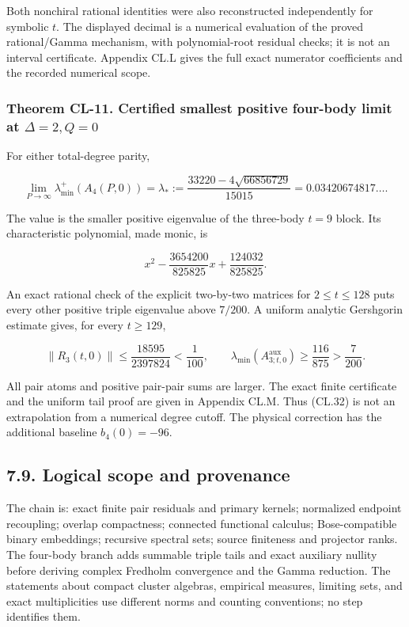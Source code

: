 \documentclass[a4paper,11pt]{article}
\numberwithin{equation}{section}
\begin{document}
Both nonchiral rational identities were also reconstructed independently for symbolic \(t\). The displayed decimal is a numerical evaluation of the proved rational/Gamma mechanism, with polynomial-root residual checks; it is not an interval certificate. Appendix CL.L gives the full exact numerator coefficients and the recorded numerical scope.

\hypertarget{theorem-cl-11.-certified-smallest-positive-four-body-limit-at-delta2q0}{%
\subsubsection{\texorpdfstring{Theorem CL-11. Certified smallest positive four-body limit at \(\Delta=2,Q=0\)}{Theorem CL-11. Certified smallest positive four-body limit at \textbackslash Delta=2,Q=0}}\label{theorem-cl-11.-certified-smallest-positive-four-body-limit-at-delta2q0}}

For either total-degree parity,

\[
\lim_{P\to\infty}\lambda_{\min}^+(A_4(P,0))
=\lambda_*:=\frac{33220-4\sqrt{66856729}}{15015}
=0.03420674817\ldots.
\tag{CL.32}
\]

The value is the smaller positive eigenvalue of the three-body \(t=9\) block. Its characteristic polynomial, made monic, is

\[
x^2-\frac{3654200}{825825}x+\frac{124032}{825825}.
\]

An exact rational check of the explicit two-by-two matrices for \(2\leq t\leq128\) puts every other positive triple eigenvalue above \(7/200\). A uniform analytic Gershgorin estimate gives, for every \(t\geq129\),

\[
\|R_3(t,0)\|\leq\frac{18595}{2397824}<\frac1{100},
\qquad
\lambda_{\min}(A_{3;t,0}^{\mathrm{aux}})\geq\frac{116}{875}>
\frac7{200}.
\tag{CL.33}
\]

All pair atoms and positive pair-pair sums are larger. The exact finite certificate and the uniform tail proof are given in Appendix CL.M. Thus (CL.32) is not an extrapolation from a numerical degree cutoff. The physical correction has the additional baseline \(b_4(0)=-96\).

\hypertarget{logical-scope-and-provenance}{%
\subsection{7.9. Logical scope and provenance}\label{logical-scope-and-provenance}}

The chain is: exact finite pair residuals and primary kernels; normalized endpoint recoupling; overlap compactness; connected functional calculus; Bose-compatible binary embeddings; recursive spectral sets; source finiteness and projector ranks. The four-body branch adds summable triple tails and exact auxiliary nullity before deriving complex Fredholm convergence and the Gamma reduction. The statements about compact cluster algebras, empirical measures, limiting sets, and exact multiplicities use different norms and counting conventions; no step identifies them.
\end{document}
